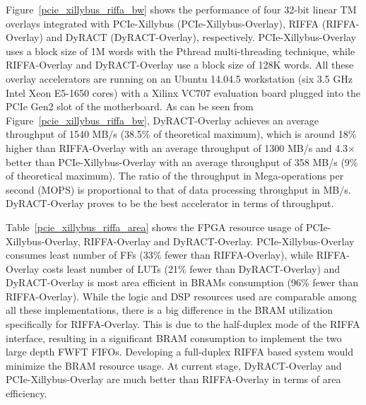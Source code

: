 Figure~\ref{pcie_xillybus_riffa_bw} shows the performance of four 32-bit linear TM overlays integrated with PCIe-Xillybus (PCIe-Xillybus-Overlay), RIFFA (RIFFA-Overlay) and DyRACT (DyRACT-Overlay), respectively. 
PCIe-Xillybus-Overlay uses a block size of 1M words with the Pthread multi-threading technique, while RIFFA-Overlay and DyRACT-Overlay use a block size of 128K words.
All these overlay accelerators are running on an Ubuntu 14.04.5 workstation (six 3.5 GHz Intel Xeon E5-1650 cores) with a Xilinx VC707 evaluation board plugged into the PCIe Gen2 slot of the motherboard. 
As can be seen from Figure~\ref{pcie_xillybus_riffa_bw}, DyRACT-Overlay achieves an average throughput of 1540 MB/s (38.5\% of theoretical maximum), which is around 18\% higher than RIFFA-Overlay with an average throughput of 1300 MB/s and 4.3$\times$ better than PCIe-Xillybus-Overlay with an average throughput of 358 MB/s (9\% of theoretical maximum). 
The ratio of the throughput in Mega-operations per second (MOPS) is proportional to that of data processing throughput in MB/s. 
DyRACT-Overlay proves to be the best accelerator in terms of throughput. 



Table~\ref{pcie_xillybus_riffa_area} shows the FPGA resource usage of PCIe-Xillybus-Overlay, RIFFA-Overlay and DyRACT-Overlay. 
PCIe-Xillybus-Overlay consumes least number of FFs (33\% fewer than RIFFA-Overlay), while RIFFA-Overlay costs least number of LUTs (21\% fewer than DyRACT-Overlay) and DyRACT-Overlay is most area efficient in BRAMs consumption (96\% fewer than RIFFA-Overlay). 
While the logic and DSP resources used are comparable among all these implementations, there is a big difference in the BRAM utilization specifically for RIFFA-Overlay.
This is due to the half-duplex mode of the RIFFA interface, resulting in a significant BRAM consumption to implement the two large depth FWFT FIFOs. 
Developing a full-duplex RIFFA based system would minimize the BRAM resource usage. 
At current stage, DyRACT-Overlay and PCIe-Xillybus-Overlay are much better than RIFFA-Overlay in terms of area efficiency. 
 
